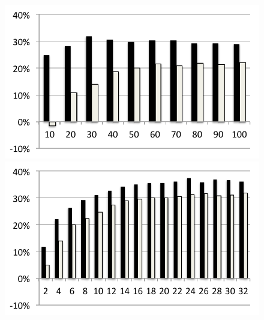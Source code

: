 \begin{figure}
  \medskip
  \includegraphics[width=\mywidth]{../../eval/32threads/case3it.pdf}\includegraphics[width=\mywidth]{../../eval/32threads/case3th.pdf}


\end{figure}
